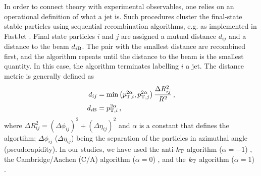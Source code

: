 In order to connect theory with experimental observables, one relies on an operational definition of what a jet is. Such procedures cluster the final-state stable particles using sequential recombination algorithms, e.g. as implemented in FastJet \cite{Cacciari:2005hq,Cacciari:2011ma}. Final state particles $i$ and $j$ are assigned a mutual distance $d_{ij}$ and a distance to the beam $d_{i\rm B}$. The pair with the smallest distance are recombined first, and the algorithm repeats until the distance to the beam is the smallest quantity. In this case, the algorithm terminates labelling $i$ a jet. The distance metric is generally defined as
\begin{align}
\label{eq:JetDistanceMetric}
d_{ij} &= \min\left(p_{{\rm \tiny T},i}^{2\alpha},p_{{\rm \tiny T},j}^{2\alpha} \right) \frac{\Delta R_{ij}^2}{R^2} \,, \\
d_{i \rm B} &= p_{{\rm \tiny T},i}^{2\alpha} \,,
\end{align}
where $\Delta R_{ij}^2 = (\Delta \phi_{ij})^2 + (\Delta \eta_{ij})^2$ and $\alpha$ is a constant that defines the algortihm; $\Delta \phi_{ij}$ ($\Delta \eta_{ij}$) being the separation of the particles in azimuthal angle (pseudorapidity). In our studies, we have used the anti-$k_{\rm \tiny T}$ algorithm ($\alpha = -1$) \cite{Cacciari:2008gp}, the Cambridge/Aachen (C/A) algorithm ($\alpha = 0$) \cite{Dokshitzer:1997in,Wobisch:1998wt}, and the $k_{\rm \tiny T}$ algorithm ($\alpha = 1$) \cite{Catani:1993hr,Ellis:1993tq}.


